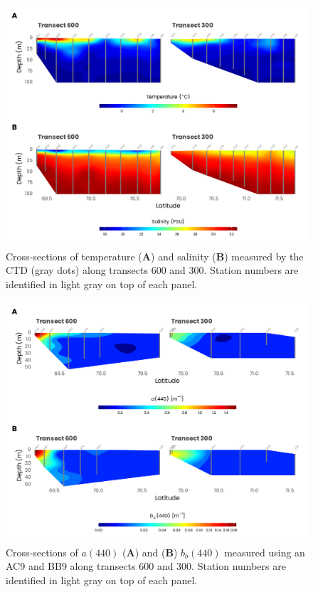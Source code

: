 \documentclass[essd, manuscript]{copernicus}
\begin{document}
\clearpage

\begin{figure}[H]
	\centering
	\includegraphics[scale = 1]{../../../graphs/fig04.pdf}
	\caption{Cross-sections of temperature (\textbf{A}) and salinity (\textbf{B}) measured by the CTD (gray dots) along transects 600 and 300. Station numbers are identified in light gray on top of each panel.}
\end{figure}

\clearpage

\begin{figure}[H]
	\centering
	\includegraphics[scale = 0.85]{../../../graphs/fig05.pdf}
	\caption{Cross-sections of $a(440)$ (\textbf{A}) and (\textbf{B}) $b_b(440)$ measured using an AC9 and BB9 along transects 600 and 300. Station numbers are identified in light gray on top of each panel.}
\end{figure}
\end{document}

